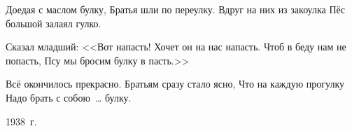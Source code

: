 Доедая с маслом булку,
Братья шли по переулку.
Вдруг на них из закоулка
Пёс большой залаял гулко.

Сказал младший: <<Вот напасть!
Хочет он на нас напасть.
Чтоб в беду нам не попасть,
Псу мы бросим булку в пасть.>>

Всё окончилось прекрасно.
Братьям сразу стало ясно,
Что на каждую прогулку
Надо брать с собою~\dots{} булку.

1938~г.
